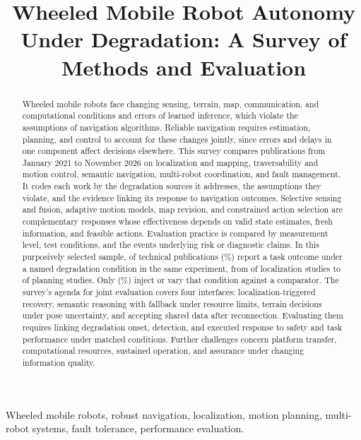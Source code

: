 \documentclass[journal]{IEEEtran}
\begin{document}
\raggedbottom
\title{Wheeled Mobile Robot Autonomy Under Degradation: A Survey of Methods and Evaluation}
\author{}
\maketitle
\begin{abstract}
Wheeled mobile robots face changing sensing, terrain, map, communication, and computational conditions and errors of learned inference, which violate the assumptions of navigation algorithms. Reliable navigation requires estimation, planning, and control to account for these changes jointly, since errors and delays in one component affect decisions elsewhere. This survey compares \CorpusCount{} publications from January 2021 to November 2026 on localization and mapping, traversability and motion control, semantic navigation, multi-robot coordination, and fault management. It codes each work by the degradation sources it addresses, the assumptions they violate, and the evidence linking its response to navigation outcomes. Selective sensing and fusion, adaptive motion models, map revision, and constrained action selection are complementary responses whose effectiveness depends on valid state estimates, fresh information, and feasible actions. Evaluation practice is compared by measurement level, test conditions, and the events underlying risk or diagnostic claims. In this purposively selected sample, \DegTaskCount{} of \CoreCount{} technical publications (\DegTaskShare\%) report a task outcome under a named degradation condition in the same experiment, from \LocSameCount{} of \LocTechCount{} localization studies to \PlnSameCount{} of \PlnTechCount{} planning studies. Only \DOneSameCount{} (\DOneSameShare\%) inject or vary that condition against a comparator. The survey's agenda for joint evaluation covers four interfaces: localization-triggered recovery, semantic reasoning with fallback under resource limits, terrain decisions under pose uncertainty, and accepting shared data after reconnection. Evaluating them requires linking degradation onset, detection, and executed response to safety and task performance under matched conditions. Further challenges concern platform transfer, computational resources, sustained operation, and assurance under changing information quality.
\end{abstract}
\begin{IEEEkeywords}
Wheeled mobile robots, robust navigation, localization, motion planning, multi-robot systems, fault tolerance, performance evaluation.
\end{IEEEkeywords}











\end{document}
